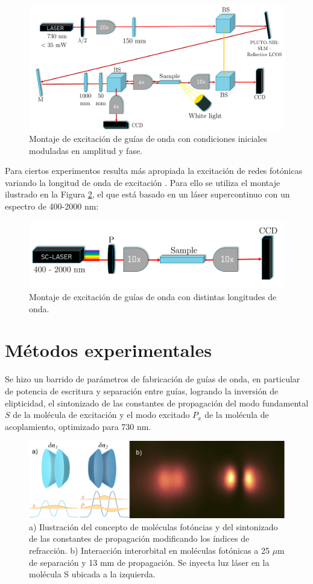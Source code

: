 \documentclass{article}
\begin{document}
\begin{figure}[H]
	\centering
	\includegraphics[width=0.7\linewidth]{./media/SLMsetup.png}
	\caption{Montaje de excitación de guías de onda con condiciones iniciales moduladas en amplitud y fase.\label{fig:SLM}}
\end{figure}



Para ciertos experimentos resulta más apropiada la excitación de redes fotónicas variando la longitud de onda de excitación \cite{spectraltransfer, SPSSH}. Para ello se utiliza el montaje ilustrado en la Figura \ref{fig:supercontinuum}, el que está basado en un láser supercontinuo con un espectro de 400-2000 nm:

\begin{figure}[H]
	\centering
	\includegraphics[width=0.5\linewidth]{./media/supercontinuum.png}
	\caption{Montaje de excitación de guías de onda con distintas longitudes de onda.\label{fig:supercontinuum}}
\end{figure}


\section{Métodos experimentales}

Se hizo un barrido de parámetros de fabricación de guías de onda, en particular de potencia de escritura y separación entre guías, logrando la inversión de elipticidad, el sintonizado de las constantes de propagación del modo fundamental $S$ de la molécula de excitación y el modo excitado $P_x$ de la molécula de acoplamiento, optimizado para 730 nm.


\begin{figure}[H]
	\centering
	\includegraphics[width=0.7\linewidth]{./media/detuningv2.png}
	\caption{a) Ilustración del concepto de moléculas fotóncias y del sintonizado de las constantes de propagación modificando los índices de refracción. b) Interacción interorbital en moléculas fotónicas a 25 $\mu$m de separación y 13 mm de propagación. Se inyecta luz láser en la molécula S ubicada a la izquierda.}
\end{figure}
\end{document}
